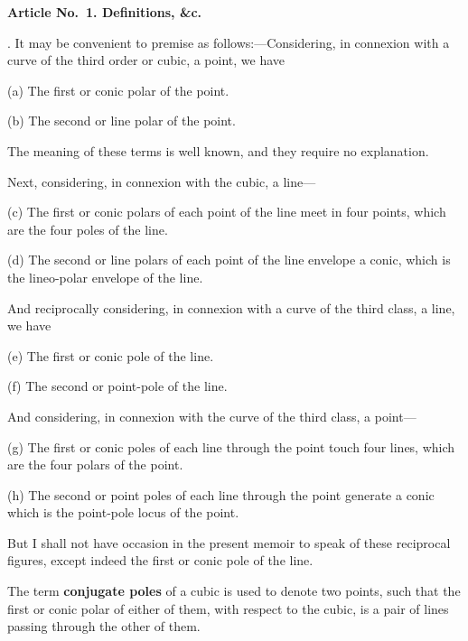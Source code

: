 \documentclass[11pt,a4paper]{book}
\begin{document}
\begin{center}
\medskip\noindent\textbf{Article No.~1. Definitions, \&c.}

. It may be convenient to premise as follows:---Considering,
in connexion with a curve of the third order or cubic, a point,
we have

\smallskip
\hspace*{2em}(a) The first or conic polar of the point.

\hspace*{2em}(b) The second or line polar of the point.

\smallskip
The meaning of these terms is well known, and they require
no explanation.

Next, considering, in connexion with the cubic, a line---

\smallskip
\hspace*{2em}(c) The first or conic polars of each point of the line meet
in four points, which are the four poles of the line.

\hspace*{2em}(d) The second or line polars of each point of the line
envelope a conic, which is the lineo-polar envelope of the line.

\smallskip
And reciprocally considering, in connexion with a curve of
the third class, a line, we have

\smallskip
\hspace*{2em}(e) The first or conic pole of the line.

\hspace*{2em}(f) The second or point-pole of the line.

\smallskip
And considering, in connexion with the curve of the third
class, a point---

\smallskip
\hspace*{2em}(g) The first or conic poles of each line through the point
touch four lines, which are the four polars of the point.

\hspace*{2em}(h) The second or point poles of each line through the point
generate a conic which is the point-pole locus of the point.

\smallskip
But I shall not have occasion in the present memoir to speak
of these reciprocal figures, except indeed the first or conic pole
of the line.

The term \textbf{conjugate poles} of a cubic is used to denote two
points, such that the first or conic polar of either of them,
with respect to the cubic, is a pair of lines passing through
the other of them.


\end{center}
\end{document}
